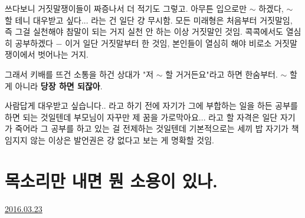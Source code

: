 쓰다보니 거짓말쟁이들이 짜증나서 더 적기도 그렇고.
아무튼 입으로만 $\sim$ 하겠다, $\sim$ 할 테니 대우받고 싶다... 라는 건 일단 걍 무시함.
모든 미래형은 처음부터  거짓말임, 즉 그걸 실천해야 참말이 되는 거지 실천 안 하는 이상 거짓말인 것임.
콕콕에서도 열심히 공부하겠다 $-$ 이거 일단 거짓말부터 한 것임, 본인들이 열심히 해야 비로소 거짓말쟁이에서 벗어나는 거지.
\vspace{5mm}

그래서 키배를 뜨건 소통을 하건 상대가 "저 $\sim$ 할 거거든요"라고 하면 한숨부터.
$\sim$ 할 게 아니라 \textbf{당장 하면 되잖아}.
\vspace{5mm}

사람답게 대우받고 싶습니다.. 라고 하기 전에 자기가 그에 부합하는 일을 하든 공부를 하면 되는 것일텐데
부모님이 자꾸만 제 꿈을 가로막아요... 라고 할 자격은 일단 자기가 죽어라 그 공부를 하고 있는 걸 전제하는 것일텐데
기본적으로는 세끼 밥 자기가 책임지지 않는 이상은 발언권은 걍 없다고 보는 게 명확할 것임.
\vspace{5mm}






\section{목소리만 내면 뭔 소용이 있나.}
\href{https://www.kockoc.com/Apoc/690820}{2016.03.23}

